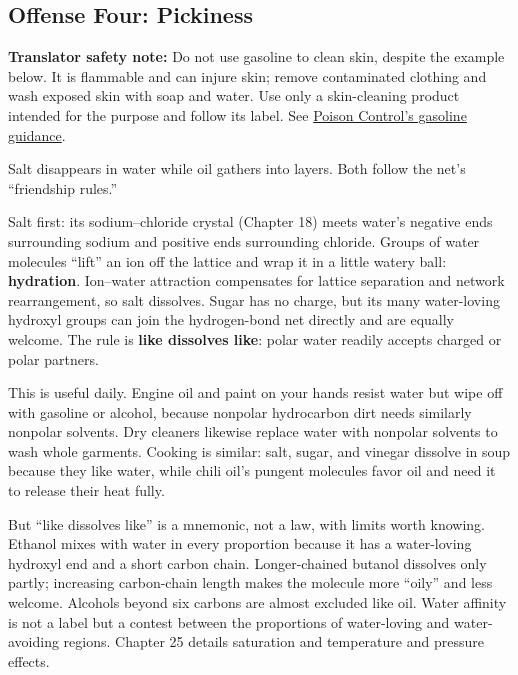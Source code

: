 \subsection{Offense Four: Pickiness}

\textbf{Translator safety note:} Do not use gasoline to clean skin, despite the example below. It is flammable and can injure skin; remove contaminated clothing and wash exposed skin with soap and water. Use only a skin-cleaning product intended for the purpose and follow its label. See \href{https://www.poison.org/articles/gasoline-and-diesel-fuel}{Poison Control's gasoline guidance}.

Salt disappears in water while oil gathers into layers. Both follow the net's ``friendship rules.''

Salt first: its sodium--chloride crystal (Chapter 18) meets water's negative ends surrounding sodium and positive ends surrounding chloride. Groups of water molecules ``lift'' an ion off the lattice and wrap it in a little watery ball: \textbf{hydration}. Ion--water attraction compensates for lattice separation and network rearrangement, so salt dissolves. Sugar has no charge, but its many water-loving hydroxyl groups can join the hydrogen-bond net directly and are equally welcome. The rule is \textbf{like dissolves like}: polar water readily accepts charged or polar partners.

This is useful daily. Engine oil and paint on your hands resist water but wipe off with gasoline or alcohol, because nonpolar hydrocarbon dirt needs similarly nonpolar solvents. Dry cleaners likewise replace water with nonpolar solvents to wash whole garments. Cooking is similar: salt, sugar, and vinegar dissolve in soup because they like water, while chili oil's pungent molecules favor oil and need it to release their heat fully.

But ``like dissolves like'' is a mnemonic, not a law, with limits worth knowing. Ethanol mixes with water in every proportion because it has a water-loving hydroxyl end and a short carbon chain. Longer-chained butanol dissolves only partly; increasing carbon-chain length makes the molecule more ``oily'' and less welcome. Alcohols beyond six carbons are almost excluded like oil. Water affinity is not a label but a contest between the proportions of water-loving and water-avoiding regions. Chapter 25 details saturation and temperature and pressure effects.

